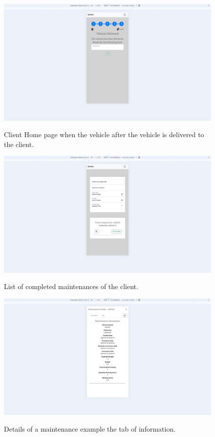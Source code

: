 \begin{figure}[h]
  \caption{Client Home page when the vehicle after the vehicle is delivered to the client.}
  \centering
  \includegraphics[width=\textwidth]{figs/Implementation/client/MaintenanceState5}
  \label{fig:MaintenanceState5}
\end{figure}

\begin{figure}[h]
  \caption{List of completed maintenances of the client.}
  \centering
  \includegraphics[width=\textwidth]{figs/Implementation/client/MaintenanceHistory}
  \label{fig:clientMaintenanceHistory}
\end{figure}


\begin{figure}[h]
  \caption{Details of a maintenance example the tab of information.}
  \centering
  \includegraphics[width=\textwidth]{figs/Implementation/client/MaintenanceDetailsInfo}
  \label{fig:MaintenanceDetailsInfo}
\end{figure}


